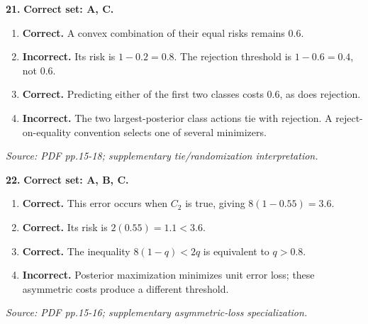 \documentclass[11pt,a4paper]{article}
\begin{document}
\par\noindent\begin{minipage}{\linewidth}
\textbf{21.} \textbf{Correct set: A, C.}
\begin{enumerate}[label=(\Alph*),leftmargin=8mm,itemsep=2pt,topsep=2pt]
\item \textbf{Correct.} A convex combination of their equal risks remains \(0.6\).
\item \textbf{Incorrect.} Its risk is \(1-0.2=0.8\). The rejection threshold is \(1-0.6=0.4\), not \(0.6\).
\item \textbf{Correct.} Predicting either of the first two classes costs \(0.6\), as does rejection.
\item \textbf{Incorrect.} The two largest-posterior class actions tie with rejection. A reject-on-equality convention selects one of several minimizers.
\end{enumerate}
{\footnotesize\textit{Source: PDF pp.15-18; supplementary tie/randomization interpretation.}}

\end{minipage}\par\vspace{3mm}
\par\noindent\begin{minipage}{\linewidth}
\textbf{22.} \textbf{Correct set: A, B, C.}
\begin{enumerate}[label=(\Alph*),leftmargin=8mm,itemsep=2pt,topsep=2pt]
\item \textbf{Correct.} This error occurs when \(C_2\) is true, giving \(8(1-0.55)=3.6\).
\item \textbf{Correct.} Its risk is \(2(0.55)=1.1<3.6\).
\item \textbf{Correct.} The inequality \(8(1-q)<2q\) is equivalent to \(q>0.8\).
\item \textbf{Incorrect.} Posterior maximization minimizes unit error loss; these asymmetric costs produce a different threshold.
\end{enumerate}
{\footnotesize\textit{Source: PDF pp.15-16; supplementary asymmetric-loss specialization.}}

\end{minipage}\par\vspace{3mm}
\end{document}

